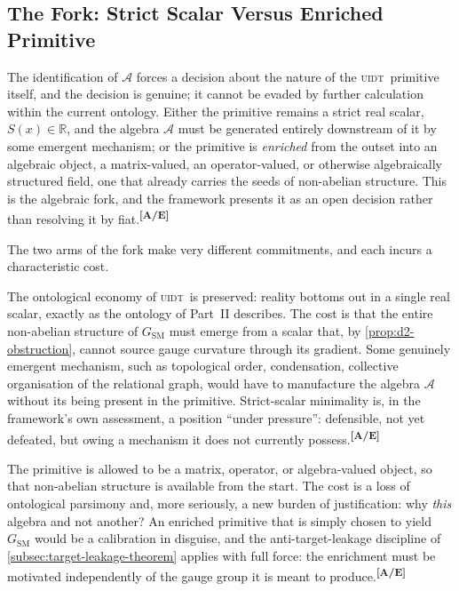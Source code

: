\documentclass[12pt,a4paper,twoside]{article}
\theoremstyle{plain}
\theoremstyle{definition}
\theoremstyle{remark}
\newcommand{\UIDT}{\textsc{uidt}}
\newcommand{\catmark}[1]{\textsuperscript{\textsf{\textbf{[#1]}}}}
\begin{document}
\subsection{The Fork: Strict Scalar Versus Enriched Primitive}
\label{subsec:the-fork}

The identification of $\mathcal{A}$ forces a decision about the nature of the \UIDT\ primitive itself, and the decision is genuine; it cannot be evaded by further calculation within the current ontology. Either the primitive remains a strict real scalar, $S(x)\in\mathbb{R}$, and the algebra $\mathcal{A}$ must be generated entirely downstream of it by some emergent mechanism; or the primitive is \emph{enriched} from the outset into an algebraic object, a matrix-valued, an operator-valued, or otherwise algebraically structured field, one that already carries the seeds of non-abelian structure. This is the algebraic fork, and the framework presents it as an open decision rather than resolving it by fiat.\catmark{A/E}

The two arms of the fork make very different commitments, and each incurs a characteristic cost.

\begin{description}[leftmargin=1.4em,style=nextline]
\item[Arm 1: Strict scalar primitive.] The ontological economy of \UIDT\ is preserved: reality bottoms out in a single real scalar, exactly as the ontology of Part~II describes. The cost is that the entire non-abelian structure of $G_{\mathrm{SM}}$ must emerge from a scalar that, by \cref{prop:d2-obstruction}, cannot source gauge curvature through its gradient. Some genuinely emergent mechanism, such as topological order, condensation, collective organisation of the relational graph, would have to manufacture the algebra $\mathcal{A}$ without its being present in the primitive. Strict-scalar minimality is, in the framework's own assessment, a position ``under pressure'': defensible, not yet defeated, but owing a mechanism it does not currently possess.\catmark{A/E} \item[Arm 2: Enriched algebraic primitive.] The primitive is allowed to be a matrix, operator, or algebra-valued object, so that non-abelian structure is available from the start. The cost is a loss of ontological parsimony and, more seriously, a new burden of justification: why \emph{this} algebra and not another? An enriched primitive that is simply chosen to yield $G_{\mathrm{SM}}$ would be a calibration in disguise, and the anti-target-leakage discipline of \cref{subsec:target-leakage-theorem} applies with full force: the enrichment must be motivated independently of the gauge group it is meant to produce.\catmark{A/E}
\end{description}
\end{document}
